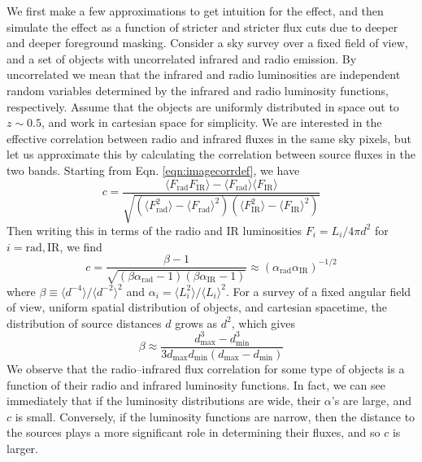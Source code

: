 \documentclass{emulateapj}
\newcommand{\mintext}{\text{min}}
\newcommand{\maxtext}{\text{max}}
\newcommand{\rad}{\text{rad}}
\newcommand{\ir}{\text{IR}}
\begin{document}
We first make a few approximations to get intuition for the effect, and then simulate the effect as a function of stricter and stricter flux cuts due to deeper and deeper foreground masking. Consider a sky survey over a fixed field of view, and a set of objects with uncorrelated infrared and radio emission. By uncorrelated we mean that the infrared and radio luminosities are independent random variables determined by the infrared and radio luminosity functions, respectively. Assume that the objects are uniformly distributed in space out to $z\sim0.5$, and work in cartesian space for simplicity. We are interested in the effective correlation between radio and infrared fluxes in the same sky pixels, but let us approximate this by calculating the correlation between source fluxes in the two bands. Starting from Eqn. \ref{eqn:imagecorrdef}, we have
\begin{equation} %
	c = \frac{\langle F_\rad F_\ir \rangle-\langle F_\rad\rangle\langle F_\ir\rangle}{\sqrt{(\langle F_\rad^2\rangle-\langle F_\rad\rangle^2)(\langle F_\ir^2\rangle-\langle F_\ir\rangle^2)}}
\end{equation}
Then writing this in terms of the radio and IR luminosities $F_i=L_i/4\pi d^2$ for $i=\rad,\ir$, we find
\begin{equation}
	c = \frac{\beta-1}{\sqrt{(\beta\alpha_\rad-1)(\beta\alpha_\ir-1)}}\approx(\alpha_\rad \alpha_\ir)^{-1/2}
\end{equation}
where $\beta\equiv\langle d^{-4}\rangle/\langle d^{-2}\rangle^2$ and $\alpha_i=\langle L_i^2\rangle/\langle L_i\rangle^2$.
For a survey of a fixed angular field of view, uniform spatial distribution of objects, and cartesian spacetime, the distribution of source distances $d$ grows as $d^2$, which gives 
\begin{equation}
	\beta\approx\frac{d_\maxtext^3-d_\mintext^3}{3d_\maxtext d_\mintext (d_\maxtext-d_\mintext)}
\end{equation}
We observe that the radio--infrared flux correlation for some type of objects is a function of their radio and infrared luminosity functions. In fact, we can see immediately that if the luminosity distributions are wide, their $\alpha$'s are large, and $c$ is small. Conversely, if the luminosity functions are narrow, then the distance to the sources plays a more significant role in determining their fluxes, and so $c$ is larger. 
\end{document}
